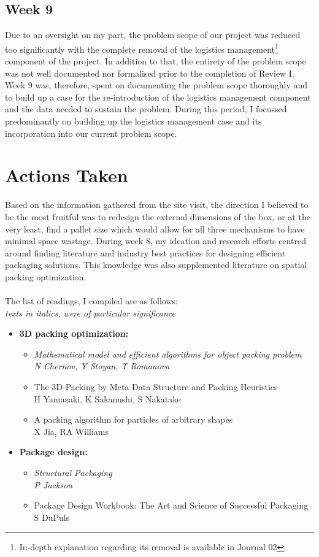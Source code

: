 \documentclass[a4paper, fleqn]{article}
\begin{document}
\subsection{Week 9}
Due to an oversight on my part, the problem scope of our project was reduced too significantly with the complete removal of the logistics management\footnote{In-depth explanation regarding its removal is available in Journal 02} component of the project. In addition to that, the entirety of the problem scope was not well documented nor formalised prior to the completion of Review I. Week 9 was, therefore, spent on documenting the problem scope thoroughly and to build up a case for the re-introduction of the logistics management component and the data needed to sustain the problem. During this period, I focussed predominantly on building up the logistics management case and its incorporation into our current problem scope.


\section{Actions Taken}

Based on the information gathered from the site visit, the direction I believed to be the most fruitful was to redesign the external dimensions of the box, or at the very least, find a pallet size which would allow for all three mechanisms to have minimal space wastage. During week 8, my ideation and research efforts centred around finding literature and industry best practices for designing efficient packaging solutions. This knowledge was also supplemented literature on spatial packing optimization.\\
\vspace{1pt}\\
The list of readings, I compiled are as follows: \\\textit{texts in italics, were of particular significance}\begin{itemize}
\item \textbf{3D packing optimization:}\begin{itemize}
\item \textit{Mathematical model and efficient algorithms for object packing problem}\\\textit{N Chernov, Y Stoyan, T Romanova}
\item The 3D-Packing by Meta Data Structure and Packing Heuristics\\
H Yamazaki, K Sakanushi, S Nakatake
\item A packing algorithm for particles of arbitrary shapes\\
X Jia, RA Williams
\end{itemize}
\item \textbf{Package design:}\begin{itemize}
\item \textit{Structural Packaging}\\
\textit{P Jackson}
\item Package Design Workbook: The Art and Science of Successful Packaging\\
S DuPuls
\end{itemize}
\end{itemize}
\pagebreak
\end{document}
